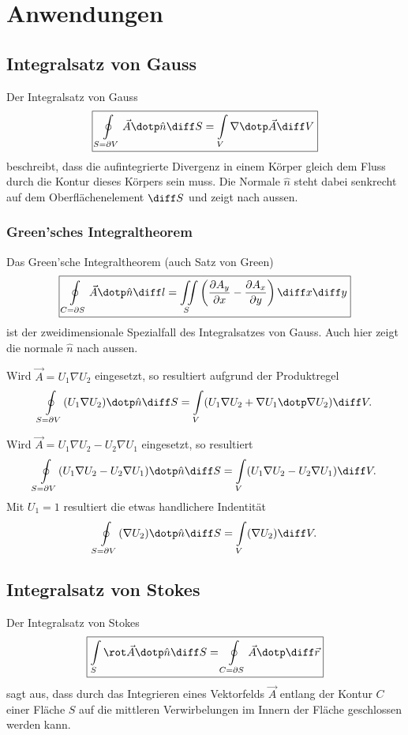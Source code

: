 
\section{Anwendungen}

\subsection{Integralsatz von Gauss}
Der Integralsatz von Gauss 
\[
    \boxed{\oint\limits_{S = \partial V} \vec{A} \dotp \hat{n} \diff S = \int\limits_{V} \nabla \dotp \vec{A} \diff V}
\]
beschreibt, dass die aufintegrierte Divergenz in einem Körper gleich dem Fluss durch die Kontur dieses Körpers sein muss.
Die Normale $\hat{n}$ steht dabei senkrecht auf dem Oberflächenelement $\diff S$ und zeigt nach aussen.

\subsubsection{Green'sches Integraltheorem}
Das Green'sche Integraltheorem (auch Satz von Green) 
\[
    \boxed{\oint\limits_{C = \partial S} \vec{A} \dotp \hat{n} \diff l = \iint\limits_{S} \left(\frac{\partial A_y}{\partial x}-\frac{\partial A_x}{\partial y}\right) \diff x \diff y }
\]
ist der zweidimensionale Spezialfall des Integralsatzes von Gauss. Auch hier zeigt die normale $\hat{n}$ nach aussen.

Wird $\vec{A} = U_1 \nabla U_2$ eingesetzt, so resultiert aufgrund der Produktregel
\[
    \oint\limits_{S = \partial V} (U_1 \nabla U_2) \dotp \hat{n} \diff S = \int\limits_{V} (U_1 \nabla U_2 + \nabla U_1 \dotp \nabla U_2) \diff V.
\]

Wird $\vec{A} = U_1 \nabla U_2 - U_2 \nabla U_1 $ eingesetzt, so resultiert
\[
    \oint\limits_{S = \partial V} (U_1 \nabla U_2 - U_2 \nabla U_1) \dotp \hat{n} \diff S = \int\limits_{V} (U_1 \nabla U_2 - U_2 \nabla U_1) \diff V.
\]
Mit $U_1 = 1$ resultiert die etwas handlichere Indentität
\[
    \oint\limits_{S = \partial V} (\nabla U_2) \dotp \hat{n} \diff S = \int\limits_{V} (\nabla U_2) \diff V.
\]

\subsection{Integralsatz von Stokes}
Der Integralsatz von Stokes
\[
    \boxed{\int\limits_{S} \rot \vec{A} \dotp \hat{n} \diff S = \oint\limits_{C = \partial S} \vec{A} \dotp \diff \vec{r}}
\]
sagt aus, dass durch das Integrieren eines Vektorfelds $\vec{A}$ entlang der Kontur $C$ einer Fläche $S$ auf die mittleren Verwirbelungen im Innern der Fläche geschlossen werden kann.

